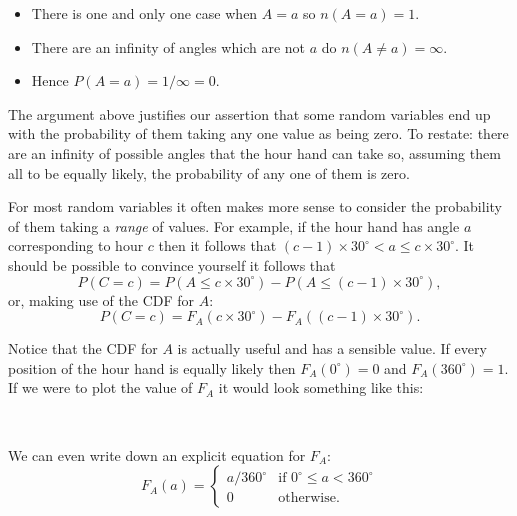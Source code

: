 \documentclass[a4paper]{article}
\begin{document}
\begin{itemize}

\item There is one and only one case when $A = a$ so $n(A = a) = 1$.

\item There are an infinity of angles which are not $a$ do $n(A \ne a) = \infty$.

\item Hence $P(A = a) = 1 / \infty = 0$.

\end{itemize}

The argument above justifies our assertion that some random variables end up
with the probability of them taking any one value as being zero. To restate:
there are an infinity of possible angles that the hour hand can take so,
assuming them all to be equally likely, the probability of any one of them is
zero.

For most random variables it often makes more sense to consider the probability
of them taking a \emph{range} of values. For example, if the hour hand has
angle $a$ corresponding to hour $c$ then it follows that $(c-1) \times 30^\circ
< a \le c \times 30^\circ$. It should be possible to convince yourself it
follows that
\[
P(C = c) = P(A \le c \times 30^\circ) - P(A \le (c-1) \times 30^\circ),
\]
or, making use of the CDF for $A$:
\[
P(C = c) = F_A(c \times 30^\circ) - F_A((c-1) \times 30^\circ).
\]

Notice that the CDF for $A$ is actually useful and has a sensible value. If
every position of the hour hand is equally likely then $F_A(0^\circ) = 0$ and
$F_A(360^\circ) = 1$. If we were to plot the value of $F_A$ it would look
something like this:

{\center
{} \\ \null
}
We can even write down an explicit equation for $F_A$:
\[
F_A(a) = \left\{
\begin{array}{cl}
a / 360^\circ & \mbox{if } 0^\circ \le a < 360^\circ \\
0 & \mbox{otherwise.}
\end{array}
\right.
\]
\end{document}
